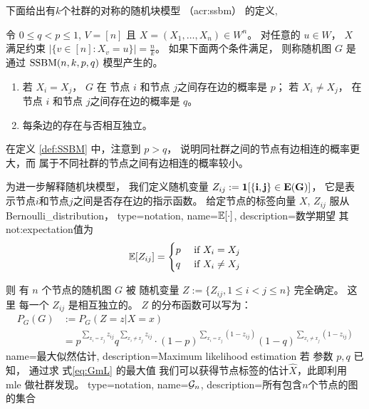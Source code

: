 下面给出有$k$个社群的对称的随机块模型
（\gls{acr:ssbm}）
的定义, 
	\begin{definition}\label{def:SSBM}
	令 $0\leq q<p\leq 1$, $V=[n]$ 且
  $X=(X_1,\dots,X_n)\in W^n$。 对任意的 $u\in W$，
  $X$ 满足约束
  $|\{v \in [n] : X_v = u\}| = \frac{n}{k}$。
	如果下面两个条件满足，
  则称随机图 $G$ 是通过 $\operatorname{SSBM}(n,k,p,q)$ 模型产生的。 
	\begin{enumerate}
	\item 若 $X_i=X_j$， $G$ 在 节点 $i$ 和节点 $j$之间存在边的概率是 $p$； 
 若 $X_i \neq X_j$，  在 节点 $i$ 和节点 $j$之间存在边的概率是 $q$。
	\item 每条边的存在与否相互独立。
	\end{enumerate}
\end{definition}

在定义 \ref{def:SSBM} 中，注意到 $p>q$，
说明同社群之间的节点有边相连的概率更大，而
属于不同社群的节点之间有边相连的概率较小。

为进一步解释随机块模型，
我们定义随机变量 $Z_{ij}:=\bf{1}[\{i,j\} \in E(G)]$，
它是表示节点$i$和节点$j$之间是否存在边的指示函数。
给定节点的标签向量 $X$, 
$Z_{ij}$ 服从 \gls{Bernoulli_distribution}，
{
  type=notation,
  name={$\operatorname{\mathbb{E}}[\cdot]$},
  description={数学期望}
}
其 \glsdesc{not:expectation}值为
\begin{equation}
\operatorname{\mathbb{E}}[Z_{ij}] =
\begin{cases}
p & \textrm{ if } X_i = X_j \\ 
q & \textrm{ if }  X_i \neq X_j
\end{cases}
\end{equation}

则 有 $n$ 个节点的随机图 $G$ 
被 
随机变量 $Z:=\{Z_{ij}, 1\leq i<j\leq n\}$ 完全确定。
这里 每一个 $Z_{ij}$ 是相互独立的。
$Z$ 的分布函数可以写为：
\begin{align}\label{eq:mle_sibm}
P_G(G)&:=P_G(Z = z| X=x) \\
&= p^{\sum_{x_i = x_j}
z_{ij}}q^{\sum_{x_i \neq x_j} z_{ij}} 
\cdot (1-p)^{\sum_{x_i = x_j} (1-z_{ij})}
(1-q)^{\sum_{x_i \neq x_j} (1-z_{ij})}
\label{eq:GmL}
\end{align}
{name=最大似然估计,
description={Maximum likelihood estimation}}
若 参数 $p, q$ 已知，
通过求
式\eqref{eq:GmL} 的最大值
我们可以获得节点标签的估计$\hat{X}$，此即利用
\gls{mle}
做社群发现。
{
  type=notation,
  name={$\mathcal{G}_n$},
  description={所有包含$n$个节点的图的集合}
}

